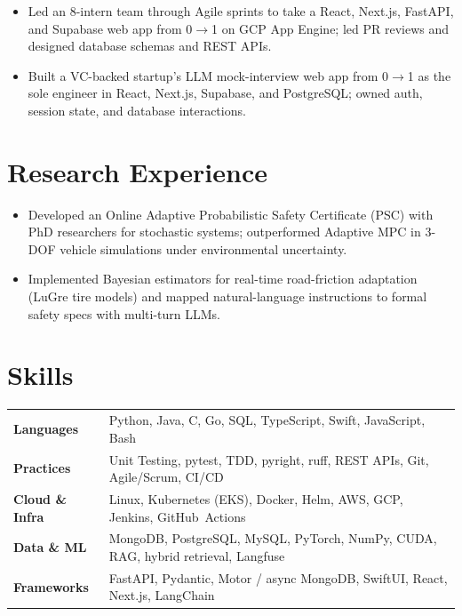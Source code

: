 \documentclass[11pt, letterpaper]{article}
\begin{document}
\vspace{1pt}
\begin{itemize}
  \item Led an 8-intern team through Agile sprints to take a React, Next.js, FastAPI, and Supabase web app from 0$\to$1 on GCP App Engine; led PR reviews and designed database schemas and REST APIs.
\end{itemize}

\vspace{1pt}
\begin{itemize}
  \item Built a VC-backed startup's LLM mock-interview web app from 0$\to$1 as the sole engineer in React, Next.js, Supabase, and PostgreSQL; owned auth, session state, and database interactions.
\end{itemize}

\section{Research Experience}
\begin{itemize}
  \item Developed an Online Adaptive Probabilistic Safety Certificate (PSC) with PhD researchers for stochastic systems; outperformed Adaptive MPC in 3-DOF vehicle simulations under environmental uncertainty.
  \item Implemented Bayesian estimators for real-time road-friction adaptation (LuGre tire models) and mapped natural-language instructions to formal safety specs with multi-turn LLMs.
\end{itemize}

\section{Skills}
\begin{tabularx}{\textwidth}{@{}l @{\hspace{7pt}} >{\raggedright\arraybackslash}X@{}}
  \textbf{Languages} & Python, Java, C, Go, SQL, TypeScript, Swift, JavaScript, Bash \\[1pt]
  \textbf{Practices} & Unit Testing, pytest, TDD, pyright, ruff, REST APIs, Git, Agile/Scrum, CI/CD \\[1pt]
  \textbf{Cloud \& Infra} & Linux, Kubernetes (EKS), Docker, Helm, AWS, GCP, Jenkins, GitHub~Actions \\[1pt]
  \textbf{Data \& ML} & MongoDB, PostgreSQL, MySQL, PyTorch, NumPy, CUDA, RAG, hybrid retrieval, Langfuse \\[1pt]
  \textbf{Frameworks} & FastAPI, Pydantic, Motor / async MongoDB, SwiftUI, React, Next.js, LangChain \\
\end{tabularx}
\end{document}
